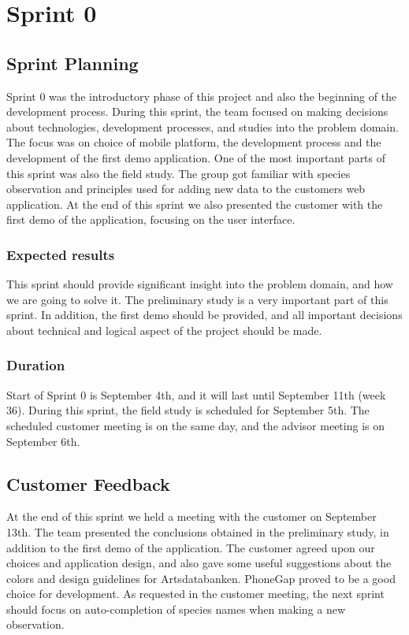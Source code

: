 \section{Sprint 0}

\subsection{Sprint Planning}
	Sprint 0 was the introductory phase of this project and also the beginning of the development process. During this sprint, the team focused on making decisions about technologies, development processes, and studies into the problem domain. The focus was on choice of mobile platform, the development process and the development of the first demo application. One of the most important parts of this sprint was also the field study. The group got familiar with species observation and principles used for adding new data to the customers web application.\newline
  At the end of this sprint we also presented the customer with the first demo of the application, focusing on the user interface.
	
	\subsubsection{Expected results}
	This sprint should provide significant insight into the problem domain, and how we are going to solve it. The preliminary study is a very important part of this sprint. In addition, the first demo should be provided, and all important decisions about technical and logical aspect of the project should be made.
	
	\subsubsection{Duration}
	Start of Sprint 0 is September 4th, and it will last until September 11th (week 36). During this sprint, the field study is scheduled for September 5th. The scheduled customer meeting is on the same day, and the advisor meeting is on September 6th.
	
	
	
\subsection{Customer Feedback}
	At the end of this sprint we held a meeting with the customer on September 13th. The team presented the conclusions obtained in the preliminary study, in addition to the first demo of the application. The customer agreed upon our choices and application design, and also gave some useful suggestions about the colors and design guidelines for Artsdatabanken. PhoneGap proved to be a good choice for development.
As requested in the customer meeting, the next sprint should focus on auto-completion of species names when making a new observation.
	
